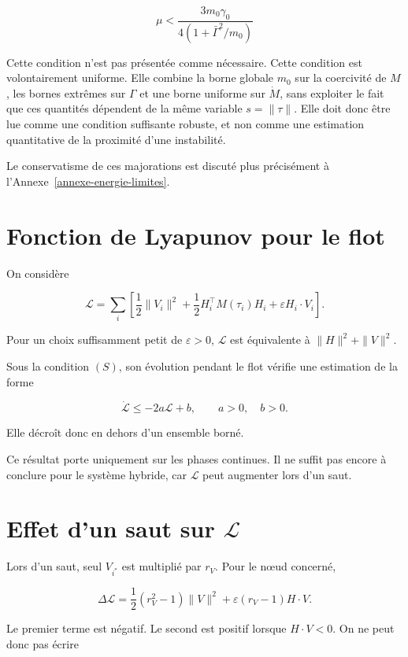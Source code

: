 \[
\boxed{
\mu
<
\frac{3m_0\gamma_0}
{4\left(1+\bar\Gamma^2/m_0\right)}
}
\tag{S}
\]

Cette condition n'est pas présentée comme nécessaire. Cette condition est volontairement uniforme. Elle combine la borne globale \(m_0\) sur la coercivité de \(M\), les bornes extrêmes sur \(\Gamma\) et une borne uniforme sur \(\dot M\), sans exploiter le fait que ces quantités dépendent de la même variable \(s=\|\tau\|\). Elle doit donc être lue comme une condition suffisante robuste, et non comme une estimation quantitative de la proximité d'une instabilité.

Le conservatisme de ces majorations est discuté plus précisément à l'Annexe~\ref{annexe-energie-limites}.

\section{Fonction de Lyapunov pour le flot}\label{t1-fonction-de-lyapunov-pour-le-flot}

On considère

\[
\mathcal L
=
\sum_i
\left[
\frac12\|V_i\|^2
+
\frac12 H_i^\top M(\tau_i)H_i
+
\varepsilon H_i\cdot V_i
\right].
\]

Pour un choix suffisamment petit de \(\varepsilon>0\), \(\mathcal L\) est équivalente à \(\|H\|^2+\|V\|^2\).

Sous la condition \((S)\), son évolution pendant le flot vérifie une estimation de la forme

\[
\dot{\mathcal L}
\leq
-2a\mathcal L+b,
\qquad
a>0,
\quad
b>0.
\]

Elle décroît donc en dehors d'un ensemble borné.

Ce résultat porte uniquement sur les phases continues. Il ne suffit pas encore à conclure pour le système hybride, car \(\mathcal L\) peut augmenter lors d'un saut.

\section{Effet d'un saut sur \texorpdfstring{\(\mathcal L\)}{L}}\label{t1-effet-dun-saut-sur-mathcal-l}

Lors d'un saut, seul \(V_{i^\ast}\) est multiplié par \(r_V\). Pour le nœud concerné,

\[
\Delta\mathcal L
=
\frac12(r_V^2-1)\|V\|^2
+
\varepsilon(r_V-1)H\cdot V.
\]

Le premier terme est négatif. Le second est positif lorsque \(H\cdot V<0\). On ne peut donc pas écrire

